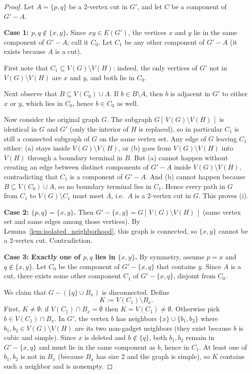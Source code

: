 \documentclass[12pt]{article}
\begin{document}
\begin{proof}
Let $A=\{p,q\}$ be a 2-vertex cut in $G'$, and let $C$ be a component of $G'-A$.

\smallskip
\noindent\textbf{Case 1: $p,q\notin\{x,y\}$.}
Since $xy\in E(G')$, the vertices $x$ and $y$ lie in the same component of $G'-A$; call it $C_0$.
Let $C_1$ be any other component of $G'-A$ (it exists because $A$ is a cut).

First note that $C_1\subseteq V(G)\setminus V(H)$: indeed, the only vertices of $G'$ not in
$V(G)\setminus V(H)$ are $x$ and $y$, and both lie in $C_0$.

Next observe that $B\subseteq V(C_0)\cup A$.
If $b\in B\setminus A$, then $b$ is adjacent in $G'$ to either $x$ or $y$, which lies in $C_0$,
hence $b\in C_0$ as well.

Now consider the original graph $G$. The subgraph $G[\,V(G)\setminus V(H)\,]$ is identical in $G$
and $G'$ (only the interior of $H$ is replaced), so in particular $C_1$ is still a connected subgraph
of $G$ on the same vertex set. Any edge of $G$ leaving $C_1$ either:
(a) stays inside $V(G)\setminus V(H)$, or (b) goes from $V(G)\setminus V(H)$ into $V(H)$ through a
boundary terminal in $B$.
But (a) cannot happen without creating an edge between distinct components of $G'-A$ inside
$V(G)\setminus V(H)$, contradicting that $C_1$ is a component of $G'-A$.
And (b) cannot happen because $B\subseteq V(C_0)\cup A$, so no boundary terminal lies in $C_1$.
Hence every path in $G$ from $C_1$ to $V(G)\setminus C_1$ must meet $A$, i.e.\ $A$ is a 2-vertex cut in $G$.
This proves (i).

\smallskip
\noindent\textbf{Case 2: $\{p,q\}=\{x,y\}$.}
Then $G'-\{x,y\}=G[\,V(G)\setminus V(H)\,]$ (same vertex set and same edges among those vertices).
By Lemma~\ref{lem:isolated_neighborhood}, this graph is connected, so $\{x,y\}$ cannot be a 2-vertex cut.
Contradiction.

\smallskip
\noindent\textbf{Case 3: Exactly one of $p,q$ lies in $\{x,y\}$.}
By symmetry, assume $p=x$ and $q\notin\{x,y\}$.
Let $C_0$ be the component of $G'-\{x,q\}$ that contains $y$.
Since $A$ is a cut, there exists some other component $C_1$ of $G'-\{x,q\}$, disjoint from $C_0$.

We claim that $G-(\{q\}\cup B_x)$ is disconnected.
Define
\[
K := V(C_1)\setminus B_x.
\]
First, $K\neq\emptyset$: if $V(C_1)\cap B_x=\emptyset$ then $K=V(C_1)\neq\emptyset$.
Otherwise pick $b\in V(C_1)\cap B_x$. In $G'$, the vertex $b$ has neighbors $\{x\}\cup\{b_1,b_2\}$
where $b_1,b_2\in V(G)\setminus V(H)$ are its two non-gadget neighbors (they exist because $b$ is cubic
and simple). Since $x$ is deleted and $b\notin\{q\}$, both $b_1,b_2$ remain in $G'-\{x,q\}$ and must lie
in the same component as $b$, hence in $C_1$. At least one of $b_1,b_2$ is not in $B_x$ (because $B_x$
has size $2$ and the graph is simple), so $K$ contains such a neighbor and is nonempty.


\end{proof}
\end{document}
